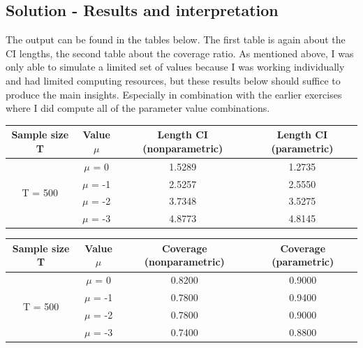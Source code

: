 \documentclass[12pt]{article}
\begin{document}
\subsection*{Solution - Results and interpretation}
The output can be found in the tables below. The first table is again about the CI lengths, the second table about the coverage ratio. As mentioned above, I was only able to simulate a limited set of values because I was working individually and had limited computing resources, but these results below should suffice to produce the main insights. Especially in combination with the earlier exercises where I did compute all of the parameter value combinations. 
\vspace{15pt}
\begin{center}
\begin{tabular}{||c | c | c c||} 
 \hline
 Sample size T & Value $\mu$ & Length CI (nonparametric) & Length CI (parametric) \\ [0.5ex] 
 \hline
 \hline
 \multirow{4}{4em}{T = 500} & $\mu$ = 0 & 1.5289 & 1.2735\\ 
& $\mu$ = -1 & 2.5257 & 2.5550 \\ 
& $\mu$ = -2 & 3.7348 & 3.5275 \\ 
& $\mu$ = -3 & 4.8773 & 4.8145 \\ 

 \hline
\end{tabular}
\end{center}


\begin{center}
\begin{tabular}{||c | c | c c||} 
 \hline
 Sample size T & Value $\mu$ & Coverage (nonparametric) & Coverage (parametric) \\ [0.5ex] 
 \hline \hline
 \multirow{4}{4em}{T = 500} & $\mu$ = 0 & 0.8200 & 0.9000\\ 
& $\mu$ = -1 & 0.7800 & 0.9400 \\ 
& $\mu$ = -2 & 0.7800 & 0.9000 \\ 
& $\mu$ = -3 & 0.7400 & 0.8800 \\ 
 \hline
\end{tabular}
\end{center}
\end{document}
